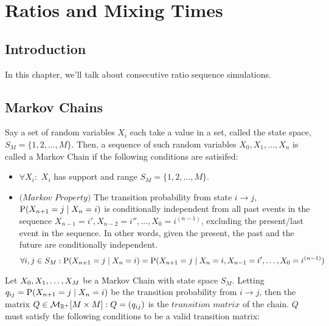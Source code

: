 \chapter{Ratios and Mixing Times}
\section{Introduction}
In this chapter, we'll talk about consecutive ratio sequence simulations.

\section{Markov Chains}



\begin{definition} Say a set of random variables $X_i$ each take a value in a set, called the state space, $S_M = \{1,2,\dots,M\}$. Then, a sequence of such random variables $X_0,X_1,\dots,X_n$ is called a Markov Chain if the following conditions are satisifed:
\end{definition}

\begin{itemize}
\item $\forall X_i:$ $X_i$ has support and range $S_M = \{1,2,...,M\}$.
\item $\textit{(Markov Property)}$ The transition probability from state $i \to j$, $\Prb(X_{n+1} = j \mid X_n = i)$ is conditionally independent from all past events in the sequence $X_{n-1} = i',X_{n-2} = i'', \dots,X_0 = i^{(n-1)}$, excluding the present/last event in the sequence. In other words, given the present, the past and the future are conditionally independent.
$$\forall i,j \in S_M: \Prb(X_{n+1} = j \mid X_n = i) = \Prb(X_{n+1} = j \mid X_n = i, X_{n-1} = i', \dots,X_0 = i^{(n-1)})$$
\end{itemize}

\begin{definition}  Let $\seq[M]{X}$ be a Markov Chain with state space $S_M$. Letting $q_{ij} = \Prb(X_{n+1} = j \mid X_n = i)$ be the transition probability from $i \to j$, then the matrix $Q \in \mathcal{M}_{\R^+}[M\times M]: Q=(q_{ij})$ is the $\textit{transition matrix}$ of the chain. $Q$ must satisfy the following conditions to be a valid transition matrix:
\end{definition}

